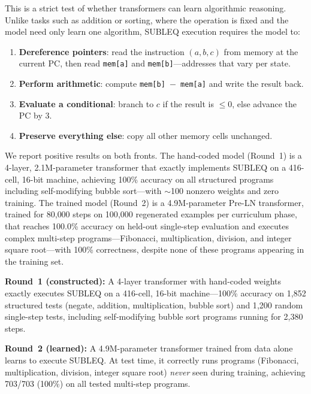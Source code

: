 \documentclass[11pt,a4paper]{article}
\begin{document}
This is a strict test of whether transformers can learn algorithmic reasoning.
Unlike tasks such as addition or sorting, where the operation is fixed and the model need only learn one algorithm, SUBLEQ execution requires the model to:
\begin{enumerate}[nosep]
  \item \textbf{Dereference pointers}: read the instruction $(a, b, c)$ from memory at the current PC, then read \texttt{mem[a]} and \texttt{mem[b]}---addresses that vary per state.
  \item \textbf{Perform arithmetic}: compute \texttt{mem[b] $-$ mem[a]} and write the result back.
  \item \textbf{Evaluate a conditional}: branch to $c$ if the result is $\leq 0$, else advance the PC by 3.
  \item \textbf{Preserve everything else}: copy all other memory cells unchanged.
\end{enumerate}

We report positive results on both fronts.
The hand-coded model (Round~1) is a 4-layer, 2.1M-parameter transformer that exactly implements SUBLEQ on a 416-cell, 16-bit machine, achieving 100\% accuracy on all structured programs including self-modifying bubble sort---with $\sim$100 nonzero weights and zero training.
The trained model (Round~2) is a 4.9M-parameter Pre-LN transformer, trained for 80{,}000 steps on 100{,}000 regenerated examples per curriculum phase, that reaches 100.0\% accuracy on held-out single-step evaluation and executes complex multi-step programs---Fibonacci, multiplication, division, and integer square root---with 100\% correctness, despite none of these programs appearing in the training set.

\begin{finding}
\textbf{Round~1 (constructed):} A 4-layer transformer with hand-coded weights exactly executes SUBLEQ on a 416-cell, 16-bit machine---100\% accuracy on 1{,}852 structured tests (negate, addition, multiplication, bubble sort) and 1{,}200 random single-step tests, including self-modifying bubble sort programs running for 2{,}380 steps.

\textbf{Round~2 (learned):} A 4.9M-parameter transformer trained from data alone learns to execute SUBLEQ. At test time, it correctly runs programs (Fibonacci, multiplication, division, integer square root) \emph{never} seen during training, achieving 703/703 (100\%) on all tested multi-step programs.
\end{finding}
\end{document}
